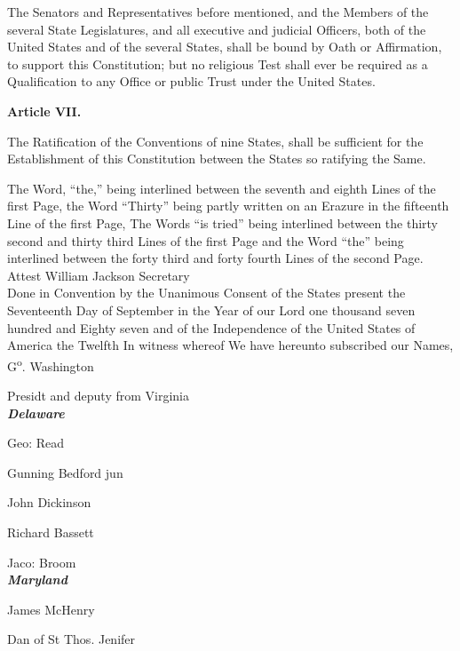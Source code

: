 The Senators and Representatives before mentioned, and the Members of the several State Legislatures, and all executive and judicial Officers, both of the United States and of the several States, shall be bound by Oath or Affirmation, to support this Constitution; but no religious Test shall ever be required as a Qualification to any Office or public Trust under the United States.\\[0.01in]

\begin{center}
{\Large \textbf{Article VII.}}
\end{center}

The Ratification of the Conventions of nine States, shall be sufficient for the Establishment of this Constitution between the States so ratifying the Same.

The Word, ``the,'' being interlined between the seventh and eighth Lines of the first Page, the Word ``Thirty'' being partly written on an Erazure in the fifteenth Line of the first Page, The Words ``is tried'' being interlined between the thirty second and thirty third Lines of the first Page and the Word ``the'' being interlined between the forty third and forty fourth Lines of the second Page.\\[0.01in]

Attest William Jackson Secretary\\[0.01in]

Done in Convention by the Unanimous Consent of the States present the Seventeenth Day of September in the Year of our Lord one thousand seven hundred and Eighty seven and of the Independence of the United States of America the Twelfth In witness whereof We have hereunto subscribed our Names,\\[0.01in]

G\textsuperscript{o}. Washington

Presidt and deputy from Virginia\\[0.01in]

\textbf{\textit{Delaware}}

Geo: Read

Gunning Bedford jun

John Dickinson

Richard Bassett

Jaco: Broom\\[0.01in]

\textbf{\textit{Maryland}}

James McHenry

Dan of St Thos. Jenifer

